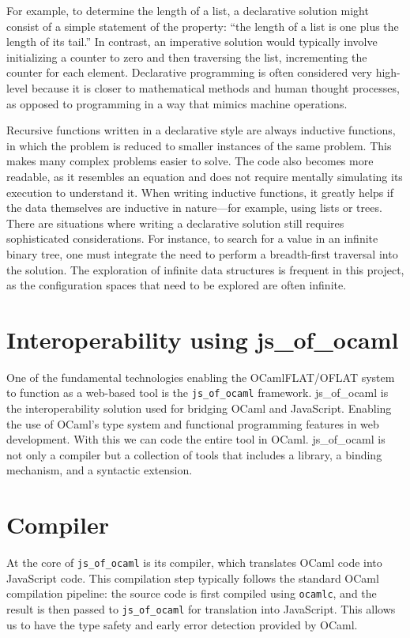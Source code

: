 For example, to determine the length of a list, a declarative solution might consist of a simple statement of the property: “the length of a list is one plus the length of its tail.” 
In contrast, an imperative solution would typically involve initializing a counter to zero and then traversing the list, incrementing the counter for each element.
Declarative programming is often considered very high-level because it is closer to mathematical methods and human thought processes, 
as opposed to programming in a way that mimics machine operations.

Recursive functions written in a declarative style are always inductive functions, in which the problem is reduced to smaller instances of the same problem. 
This makes many complex problems easier to solve. The code also becomes more readable, as it resembles an equation and does not require mentally simulating its execution to understand it. 
When writing inductive functions, it greatly helps if the data themselves are inductive in nature—for example, using lists or trees.
There are situations where writing a declarative solution still requires sophisticated considerations. 
For instance, to search for a value in an infinite binary tree, one must integrate the need to perform a breadth-first traversal into the solution. 
The exploration of infinite data structures is frequent in this project, as the configuration spaces that need to be explored are often infinite.

\section{Interoperability using js\_of\_ocaml}

One of the fundamental technologies enabling the OCamlFLAT/OFLAT system to function as a web-based tool is the \texttt{js\_of\_ocaml} framework. 
js\_of\_ocaml\cite{js-of-ocaml-manual} is the interoperability solution used for bridging OCaml and JavaScript. 
Enabling the use of OCaml's type system and functional programming features in web development.
With this we can code the entire tool in OCaml.
js\_of\_ocaml is not only a compiler but a collection of tools that includes a library, a binding mechanism, and a syntactic extension.

\section*{Compiler}

At the core of \texttt{js\_of\_ocaml} is its compiler, which translates OCaml code into JavaScript code. 
This compilation step typically follows the standard OCaml compilation pipeline: 
the source code is first compiled using \texttt{ocamlc}, and the result is then passed to \texttt{js\_of\_ocaml} for translation into JavaScript.
This allows us to have the type safety and early error detection provided by OCaml.

